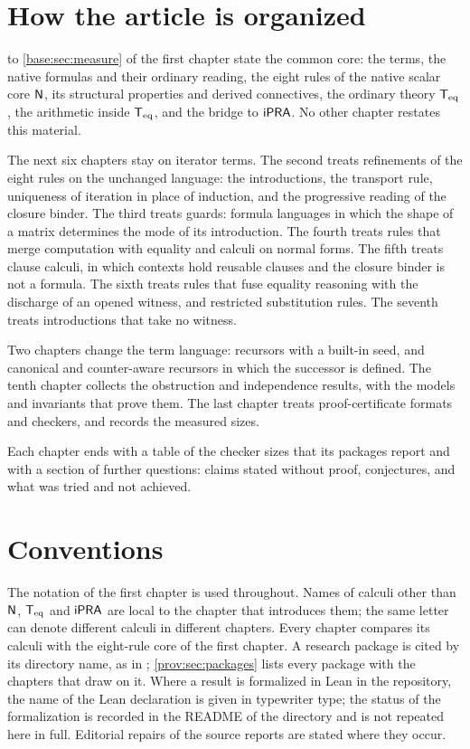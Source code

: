 \section*{How the article is organized}

 to \cref{base:sec:measure} of the first chapter state
the common core: the terms, the native formulas and their ordinary reading,
the eight rules of the native scalar core $\mathsf{N}$, its structural properties
and derived connectives, the ordinary theory $\mathsf{T}_{\mathrm{eq}}$, the arithmetic inside
$\mathsf{T}_{\mathrm{eq}}$, and the bridge to $\mathsf{iPRA}$. No other chapter restates this material.

The next six chapters stay on iterator terms. The second treats refinements
of the eight rules on the unchanged language: the introductions, the
transport rule, uniqueness of iteration in place of induction, and the
progressive reading of the closure binder. The third treats guards: formula
languages in which the shape of a matrix determines the mode of its
introduction. The fourth treats rules that merge computation with equality and
calculi on normal forms. The fifth treats clause calculi, in which contexts
hold reusable clauses and the closure binder is not a formula. The sixth
treats rules that fuse equality reasoning with the discharge of an opened
witness, and restricted substitution rules. The seventh treats introductions
that take no witness.

Two chapters change the term language: recursors with a built-in seed, and
canonical and counter-aware recursors in which the successor is defined.
The tenth chapter collects the obstruction and independence results, with the
models and invariants that prove them. The last chapter treats
proof-certificate formats and checkers, and records the measured sizes.

Each chapter ends with a table of the checker sizes that its packages report
and with a section of further questions: claims stated without proof,
conjectures, and what was tried and not achieved.

\section*{Conventions}

The notation of the first chapter is used throughout. Names of calculi other
than $\mathsf{N}$, $\mathsf{T}_{\mathrm{eq}}$ and $\mathsf{iPRA}$ are local to the chapter that introduces
them; the same letter can denote different calculi in different chapters.
Every chapter compares its calculi with the eight-rule core of the first
chapter. A research package is cited by its directory name, as in
; \cref{prov:sec:packages} lists every package with the
chapters that draw on it. Where a result is formalized in Lean in the
repository, the name of the Lean declaration is given in typewriter type; the
status of the formalization is recorded in the README of the directory and is
not repeated here in full. Editorial repairs of the source reports are stated
where they occur.
